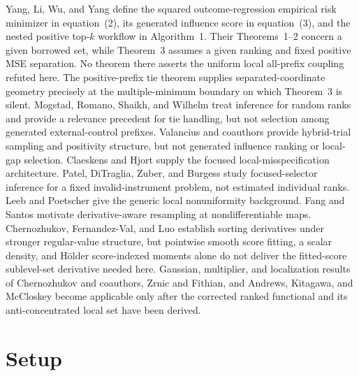 \documentclass{article}
\begin{document}
Yang, Li, Wu, and Yang define the squared outcome-regression empirical risk minimizer in equation~(2), its generated influence score in equation~(3), and the nested positive top-\(k\) workflow in Algorithm~1.  Their Theorems~1--2 concern a given borrowed set, while Theorem~3 assumes a given ranking and fixed positive MSE separation.  No theorem there asserts the uniform local all-prefix coupling refuted here.  The positive-prefix tie theorem supplies separated-coordinate geometry precisely at the multiple-minimum boundary on which Theorem~3 is silent.  Mogstad, Romano, Shaikh, and Wilhelm treat inference for random ranks and provide a relevance precedent for tie handling, but not selection among generated external-control prefixes.  Valancius and coauthors provide hybrid-trial sampling and positivity structure, but not generated influence ranking or local-gap selection.  Claeskens and Hjort supply the focused local-misspecification architecture.  Patel, DiTraglia, Zuber, and Burgess study focused-selector inference for a fixed invalid-instrument problem, not estimated individual ranks.  Leeb and Poetscher give the generic local nonuniformity background.  Fang and Santos motivate derivative-aware resampling at nondifferentiable maps.  Chernozhukov, Fernandez-Val, and Luo establish sorting derivatives under stronger regular-value structure, but pointwise smooth score fitting, a scalar density, and Hölder score-indexed moments alone do not deliver the fitted-score sublevel-set derivative needed here.  Gaussian, multiplier, and localization results of Chernozhukov and coauthors, Zrnic and Fithian, and Andrews, Kitagawa, and McCloskey become applicable only after the corrected ranked functional and its anti-concentrated local set have been derived.

\section{Setup}
\end{document}
